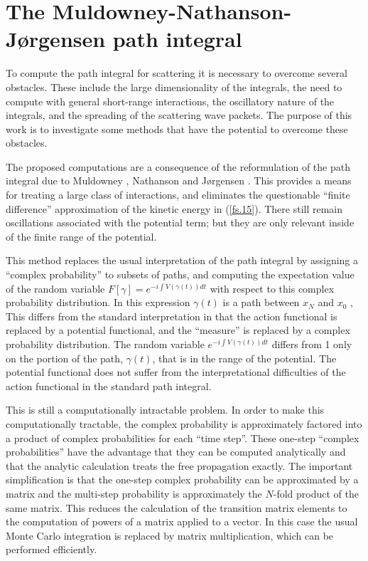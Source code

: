 \documentclass[aps,prc,reprint,noshowpacs,groupedaddress,onecolumn]{revtex4}
\begin{document}
\section{The Muldowney-Nathanson-J{\o}rgensen path integral}

To compute the path integral for scattering it is necessary to
overcome several obstacles.  These include the large dimensionality of
the integrals, the need to compute with general short-range
interactions, the oscillatory nature of the integrals,
and the spreading of the scattering wave packets.  The purpose of
this work is to investigate some methods that have the potential to
overcome these obstacles.

The proposed computations are a consequence of the reformulation of
the path integral due to Muldowney \cite{Muldowney}, Nathanson and 
J{\o}rgensen \cite{Katya_1}\cite{Katya_2}.  This
provides a means for treating a large class of interactions, and
eliminates the questionable ``finite difference'' approximation of the
kinetic energy in (\ref{fs.15}).  There still remain oscillations
associated with the potential term; but they are only relevant inside
of the finite range of the potential.

This method replaces the usual interpretation of the path integral by
assigning a ``complex probability'' to subsets of 
paths, and computing
the expectation value of the random variable $F[\gamma] = e^{-i \int
V(\gamma (t) ) dt}$ with respect to this complex probability
distribution.  In this expression $\gamma(t)$ is a path
between $x_N$ and $x_0$ , This differs from the standard
interpretation in that the action functional is replaced by a
potential functional, and the ``measure'' is replaced by a complex
probability distribution.  The random variable $e^{-i \int V(\gamma
  (t) ) dt}$ differs from 1 only on the portion of the path, $\gamma
(t)$, that is in the range of the potential.  The potential functional
does not suffer from the interpretational difficulties of the action
functional in the standard path integral.

This is still a computationally intractable problem.  In order to make
this computationally tractable, the complex probability is
approximately factored into a product of complex probabilities for
each ``time step''. These one-step ``complex probabilities'' have the
advantage that they can be computed analytically and that the analytic
calculation treats the free propagation exactly.  The important
simplification is that the one-step complex probability can be
approximated by a matrix and the multi-step probability is
approximately the $N$-fold product of the same matrix.  This reduces
the calculation of the transition matrix elements to the computation
of powers of a matrix applied to a vector.  In this case the usual
Monte Carlo integration is replaced by matrix multiplication, which
can be performed efficiently. 
\end{document}
